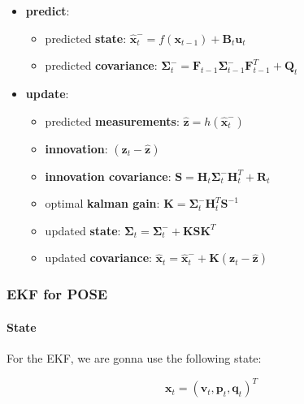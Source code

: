 \documentclass[12pt,]{article}
\let\savedparagraph\paragraph %
\let\paragraph\oldparagraph %
\let\paragraph\savedparagraph %
\providecommand{\tightlist}{%
  \setlength{\itemsep}{0pt}\setlength{\parskip}{0pt}}
\let\oldparagraph\paragraph
\renewcommand{\paragraph}[1]{\oldparagraph{#1}\mbox{}}
\begin{document}
\begin{itemize}
\tightlist
\item
  \textbf{predict}:

  \begin{itemize}
  \tightlist
  \item
    predicted \textbf{state}:
    \(\hat{\mathbf{x}}^{-}_t = f(\mathbf{x}_{t-1}) + \mathbf{B}_t \mathbf{u}_t\)
  \item
    predicted \textbf{covariance}:
    \(\mathbf{\Sigma}^{-}_t = \mathbf{F}_{t-1} \mathbf{\Sigma}^{-}_{t-1} \mathbf{F}_{t-1}^T + \mathbf{Q}_t\)
  \end{itemize}
\item
  \textbf{update}:

  \begin{itemize}
  \tightlist
  \item
    predicted \textbf{measurements}:
    \(\hat{\mathbf{z}} = h(\hat{\mathbf{x}}^{-}_t)\)
  \item
    \textbf{innovation}: \((\mathbf{z}_t - \hat{\mathbf{z}})\)\\
  \item
    \textbf{innovation covariance}:
    \(\mathbf{S} = \mathbf{H}_t \mathbf{\Sigma}^{-}_t \mathbf{H}_t^T + \mathbf{R}_t\)\\
  \item
    optimal \textbf{kalman gain}:
    \(\mathbf{K} = \mathbf{\Sigma}^{-}_t \mathbf{H}_t^T \mathbf{S}^{-1}\)
  \item
    updated \textbf{state}:
    \(\mathbf{\Sigma}_t = \mathbf{\Sigma}^-_t + \mathbf{K} \mathbf{S} \mathbf{K}^T\)
  \item
    updated \textbf{covariance}:
    \(\hat{\mathbf{x}}_t = \hat{\mathbf{x}}^{-}_t + \mathbf{K}(\mathbf{z}_t - \hat{\mathbf{z}})\)
  \end{itemize}
\end{itemize}

\subsubsection{EKF for POSE}\label{ekf-for-pose}

\paragraph{State}\label{state-3}

For the EKF, we are gonna use the following state:

\[\mathbf{x}_t = (\mathbf{v}_t, \mathbf{p}_t, \mathbf{q}_t)^T\]
\end{document}

